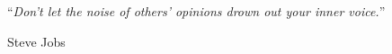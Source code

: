 
\vspace*{0.2\textheight}

\noindent\enquote{\itshape Don't let the noise of others' opinions drown out your inner voice.}\bigbreak

\hfill Steve Jobs
\normalfont

